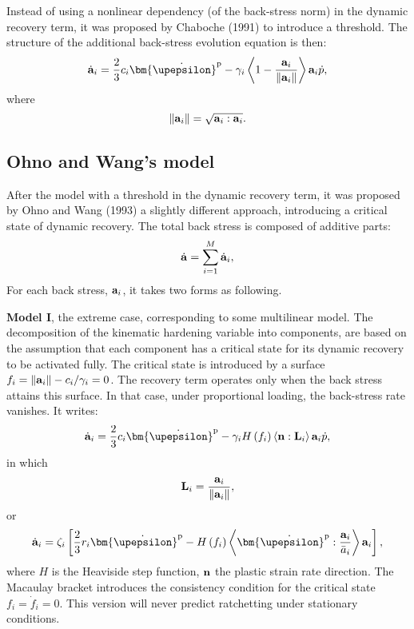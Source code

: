 Instead of using a nonlinear dependency (of the back-stress norm) in the dynamic recovery term, it was proposed by Chaboche (1991) \cite{Chaboche1991661} to introduce a threshold. The structure of the additional back-stress evolution equation is then:
\begin{equation}
{\dot{\bf a}}_i = \frac{2}{3}c_i{{\bm{\dot \upepsilon }}^{\rm{p}}} - {\gamma _i} \left\langle {1 - \frac{{\bf{a}}_i}{{\left\| {\bf{a}}_i \right\|}}} \right\rangle {\bf{a}}_i\dot p,
\end{equation}
where
\begin{equation}
\left\| {\bf{a}}_i \right\| = \sqrt {{\bf{a}}_i:{\bf{a}}_i}.
\end{equation}

\subsection{Ohno and Wang's model}
\noindent
After the model with a threshold in the dynamic recovery term, it was proposed by Ohno and Wang (1993) \cite{ohno1993kinematic} a slightly different approach, introducing a critical state of dynamic recovery.
The total back stress is composed of additive parts:
\begin{equation}
{\dot{\bf a}} = \sum\limits_{i = 1}^M {{{{\dot{\bf a}}}_i}},
\end{equation}
For each back stress, ${\bf{a}}_i$, it takes two forms as following.

\textbf{Model I}, the extreme case, corresponding to some multilinear model.
The decomposition of the kinematic hardening variable into components, are based on the assumption that each component has a critical state for its dynamic recovery to be activated fully.
The critical state is introduced by a surface ${f_i} = \left\| {{{\bf{a}}_i}} \right\| - {c_i}/{\gamma _i} = 0$.
The recovery term operates only when the back stress attains this surface.
In that case, under proportional loading, the back-stress rate vanishes. It writes:
\begin{equation}
{{\dot{\bf a}}_i} = \frac{2}{3}{c_i}{{\bm{\dot \upepsilon }}^{\rm{p}}} - {\gamma _i}H\left( {{f_i}} \right)\left\langle {{\bf{n}}:{{\bf{L}}_i}} \right\rangle {{\bf{a}}_i}\dot p,
\end{equation}
in which
\begin{equation}
{{\bf{L}}_i} = \frac{{{{\bf{a}}_i}}}{{\left\| {{{\bf{a}}_i}} \right\|}},
\end{equation}
or
\begin{equation}
{{\dot{\bf a}}_i} = {\zeta _i}\left[ {\frac{2}{3}{r_i}{{{\bm{\dot \upepsilon }}}^{\rm{p}}} - H\left( {{f_i}} \right)\left\langle {{{{\bm{\dot \upepsilon }}}^{\rm{p}}}:\frac{{{{\bf{a}}_i}}}{{{{\bar a}_i}}}} \right\rangle {{\bf{a}}_i}} \right],
\label{Eqn:Introduction2}
\end{equation}
where $H$ is the Heaviside step function, ${\bf{n}}$ the plastic strain rate direction.
The Macaulay bracket introduces the consistency condition for the critical state ${f_i} = {\dot f_i} = 0$.
This version will never predict ratchetting under stationary conditions.

